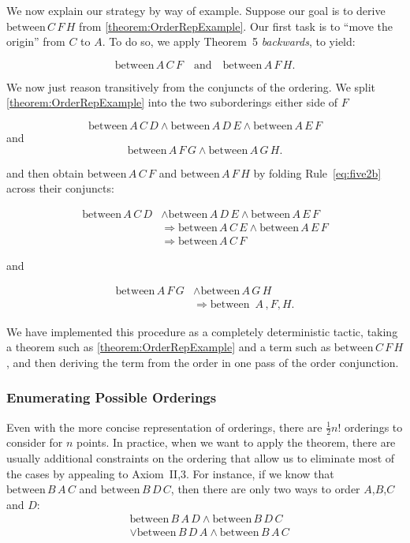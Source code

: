 \documentclass{article}
\newcommand{\between}[3]{\text{between}\,#1\,#2\,#3}
\newcommand{\fourbet}[4]{\between{#1}{#2}{#3}\wedge\between{#1}{#3}{#4}}
\begin{document}
We now explain our strategy by way of example. Suppose our goal is to derive $\between{C}{F}{H}$ from \eqref{theorem:OrderRepExample}. Our first task is to ``move the origin'' from $C$ to $A$. To do so, we apply Theorem~5 \emph{backwards}, to yield:

\begin{displaymath}
\between{A}{C}{F} \quad\text{and}\quad \between{A}{F}{H}.
\end{displaymath}

We now just reason transitively from the conjuncts of the ordering. We split \eqref{theorem:OrderRepExample} into the two suborderings either side of $F$

\begin{displaymath}
\between{A}{C}{D} \wedge \between{A}{D}{E} \wedge\between{A}{E}{F}
\end{displaymath}
and
\begin{displaymath}
\between{A}{F}{G}\wedge\between{A}{G}{H}.
\end{displaymath}

and then obtain $\between{A}{C}{F}$ and $\between{A}{F}{H}$ by folding Rule~\eqref{eq:five2b} across their conjuncts:

\begin{align*}
\between{A}{C}{D} &\wedge \between{A}{D}{E} \wedge\between{A}{E}{F}\\
&\Longrightarrow \between{A}{C}{E} \wedge \between{A}{E}{F}\\
&\Longrightarrow \between{A}{C}{F}
\end{align*}

and

\begin{align*}
\between{A}{F}{G} &\wedge \between{A}{G}{H}\\
&\Longrightarrow \between\,A,F,H.
\end{align*}

We have implemented this procedure as a completely deterministic tactic, taking a theorem such as \eqref{theorem:OrderRepExample} and a term such as $\between{C}{F}{H}$, and then deriving the term from the order in one pass of the order conjunction.

\subsubsection{Enumerating Possible Orderings}
Even with the more concise representation of orderings, there are $\frac{1}{2}n!$ orderings to consider for $n$ points. In practice, when we want to apply the theorem, there are usually additional constraints on the ordering that allow us to eliminate most of the cases by appealing to Axiom~II,3. For instance, if we know that $\between{B}{A}{C}$ and $\between{B}{D}{C}$, then there are only two ways to order $A$,$B$,$C$ and $D$:
\begin{align*}
&\fourbet{B}{A}{D}{C}\\
&\vee\fourbet{B}{D}{A}{C}
\end{align*}
\end{document}
